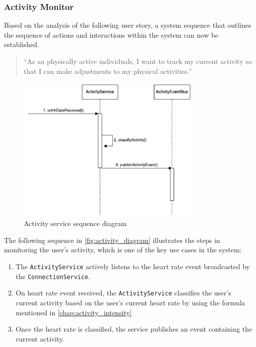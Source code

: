 \subsubsection{Activity Monitor}
\label{chap:activity_monitor_design}
Based on the analysis of the following user story, a system sequence that outlines the sequence of actions and interactions within the system can now be established.
\begin{quotation}
    \enquote{As an physically active individuals, I want to track my current activity so that I can make adjustments to my physical activities.} 
\end{quotation}

\begin{figure}[H]
    \centering
    \includegraphics[width=0.8\textwidth]{diagrams/activity-monitor-seq.drawio.png}
    \caption{Activity service sequence diagram}
    \label{fig:activity_diagram}
\end{figure}

The following sequence in \autoref{fig:activity_diagram} illustrates the steps in monitoring the user's activity, which is one of the key use cases in the system:
\begin{enumerate}
    \item The \texttt{ActivityService} actively listens to the heart rate event broadcasted by the \texttt{ConnectionService}.
    \item On heart rate event received, the \texttt{ActivityService} classifies the user's current activity based on the user's current heart rate by using the formula mentioned in \autoref{chap:activity_intensity}
    \item Once the heart rate is classified, the service publishes an event containing the current activity.
\end{enumerate}


